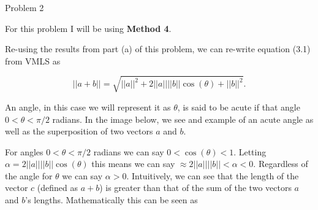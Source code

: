 \begin{problem}{Problem 2}
    \begin{Highlight}
        For this problem I will be using \textbf{Method 4}. \vspace*{1em}

        Re-using the results from part (a) of this problem, we can re-write equation (3.1) from VMLS as 

        \begin{equation}
            ||a + b|| = \sqrt{||a||^{2} + 2||a||||b||\cos{(\theta)} + ||b||^2}.
        \end{equation}

        An angle, in this case we will represent it as $\theta$, is said to be acute if that angle $0 < \theta < \pi /2$ radians. In the image below, we see and example of an acute angle as well as
        the superposition of two vectors $a$ and $b$.

        \begin{center}
            \hspace*{10pt}
        \end{center}

        For angles $0 < \theta < \pi / 2$ radians we can say $0 < \cos{(\theta) < 1}$. Letting $\alpha = 2||a||||b||\cos{(\theta)}$ this means we can say $\approx 2||a||||b|| < \alpha < 0$. Regardless 
        of the angle for $\theta$ we can say $\alpha > 0$. Intuitively, we can see that the length of the vector $c$ (defined as $a+b$) is greater than that of the sum of the two vectors $a$ and $b$'s 
        lengths. Mathematically this can be seen as


\end{Highlight}
\end{problem}
